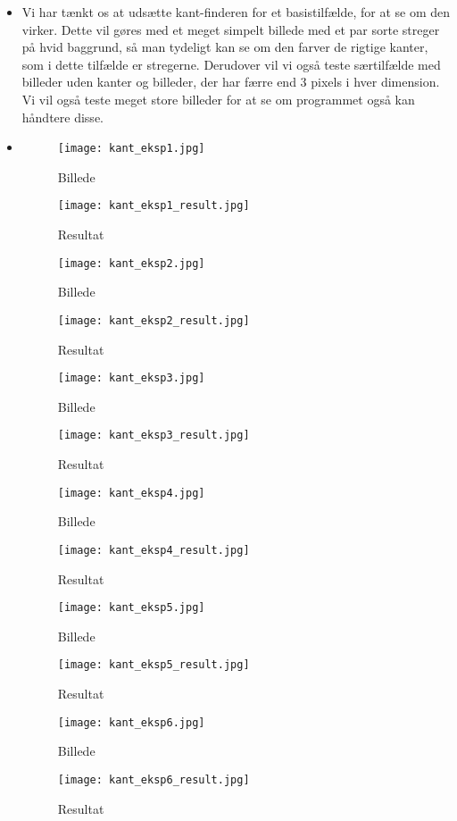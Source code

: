 \documentclass{article}
\begin{document}
\begin{itemize}
	\item Vi har tænkt os at udsætte kant-finderen for et 
	basistilfælde, for at se om den virker. Dette vil gøres
	med et meget simpelt billede med et par sorte streger
	på hvid baggrund, så man tydeligt kan se om den farver
	de rigtige kanter, som i dette tilfælde er stregerne.
	Derudover vil vi også teste særtilfælde med billeder 
	uden kanter og billeder, der har færre end 3 pixels
	i hver dimension. Vi vil også teste meget store 
	billeder for at se om programmet også kan håndtere
	disse.
	\item 
	\begin{figure}
		\centering
		\texttt{[image: kant\_eksp1.jpg]}
		\caption{Billede}
		\label{ke1}
	\end{figure}
	\begin{figure}
		\centering
		\texttt{[image: kant\_eksp1\_result.jpg]}
		\caption{Resultat}
		\label{ke1r}
	\end{figure}
	\begin{figure}
		\centering
		\texttt{[image: kant\_eksp2.jpg]}
		\caption{Billede}
		\label{ke2}
	\end{figure}
	\begin{figure}
		\centering
		\texttt{[image: kant\_eksp2\_result.jpg]}
		\caption{Resultat}
		\label{ke2r}
	\end{figure}
	\begin{figure}
		\centering
		\texttt{[image: kant\_eksp3.jpg]}
		\caption{Billede}
		\label{ke3}
	\end{figure}
	\begin{figure}
		\centering
		\texttt{[image: kant\_eksp3\_result.jpg]}
		\caption{Resultat}
		\label{ke3r}
	\end{figure}
	\begin{figure}
		\centering
		\texttt{[image: kant\_eksp4.jpg]}
		\caption{Billede}
		\label{ke4}
	\end{figure}
	\begin{figure}
		\centering
		\texttt{[image: kant\_eksp4\_result.jpg]}
		\caption{Resultat}
		\label{ke4r}
	\end{figure}
	\begin{figure}
		\centering
		\texttt{[image: kant\_eksp5.jpg]}
		\caption{Billede}
		\label{ke5}
	\end{figure}
	\begin{figure}
		\texttt{[image: kant\_eksp5\_result.jpg]}
		\caption{Resultat}
		\label{ke5r}
	\end{figure}
	\begin{figure}
		\centering
		\texttt{[image: kant\_eksp6.jpg]}
		\caption{Billede}
		\label{ke6}
	\end{figure}
	\begin{figure}
		\centering
		\texttt{[image: kant\_eksp6\_result.jpg]}
		\caption{Resultat}
		\label{ke6r}
	\end{figure}
\end{itemize}
\end{document}
